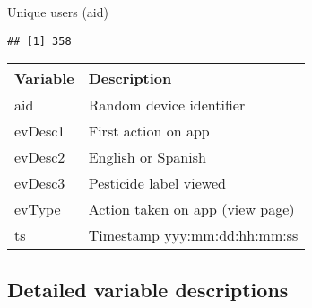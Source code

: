 \documentclass[
]{article}
\newenvironment{Shaded}{\begin{snugshade}}{\end{snugshade}}
\newcommand{\AttributeTok}[1]{\textcolor[rgb]{0.77,0.63,0.00}{#1}}
\newcommand{\FloatTok}[1]{\textcolor[rgb]{0.00,0.00,0.81}{#1}}
\newcommand{\FunctionTok}[1]{\textcolor[rgb]{0.00,0.00,0.00}{#1}}
\newcommand{\NormalTok}[1]{#1}
\newcommand{\SpecialCharTok}[1]{\textcolor[rgb]{0.00,0.00,0.00}{#1}}
\newcommand{\StringTok}[1]{\textcolor[rgb]{0.31,0.60,0.02}{#1}}
\begin{document}
Unique users (aid)

\begin{Shaded}
\end{Shaded}

\begin{verbatim}
## [1] 358
\end{verbatim}

\begin{longtable}[]{@{}ll@{}}
\toprule
Variable & Description \\
\midrule
\endhead
aid & Random device identifier \\
evDesc1 & First action on app \\
evDesc2 & English or Spanish \\
evDesc3 & Pesticide label viewed \\
evType & Action taken on app (view page) \\
ts & Timestamp yyy:mm:dd:hh:mm:ss \\
\bottomrule
\end{longtable}

\hypertarget{detailed-variable-descriptions}{%
\subsection{Detailed variable
descriptions}\label{detailed-variable-descriptions}}
\end{document}
